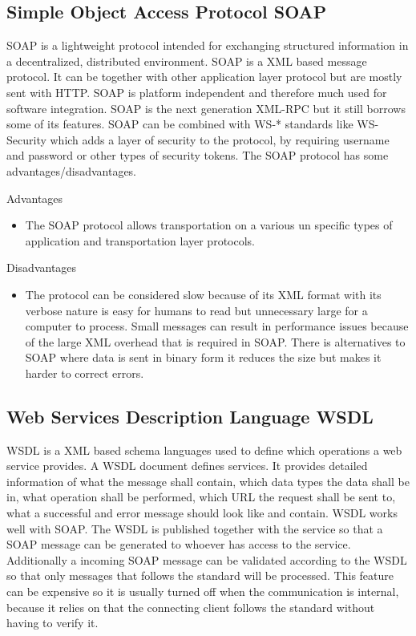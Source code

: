 \documentclass{llncs}
\begin{document}
\subsection{Simple Object Access Protocol SOAP}
SOAP is a lightweight protocol intended for exchanging structured information in a decentralized, distributed environment\cite{w3csoap}. SOAP is a XML based message protocol. It can be together with other application layer protocol but are mostly sent with HTTP. SOAP is platform independent and therefore much used for software  integration. SOAP is the next generation XML-RPC but it still borrows some of its features. SOAP can be combined with WS-* standards like WS-Security which adds a layer of security to the protocol, by requiring username and password or other types of security tokens. The SOAP protocol has some advantages/disadvantages.

Advantages
\begin{itemize}
\item The SOAP protocol allows transportation on a various un specific types of application and transportation layer protocols.
\end{itemize}
Disadvantages
\begin{itemize}
\item The protocol can be considered slow because of its XML format with its verbose nature is easy for humans to read but unnecessary large for a computer to process. Small messages can result in performance issues because of the large XML overhead that is required in SOAP. There is alternatives to SOAP where data is sent in binary form it reduces the size but makes it harder to correct errors.
\end{itemize}


\subsection{Web Services Description Language WSDL}
WSDL is a XML based schema languages used to define which operations a web service provides. A WSDL document defines services\cite{w3cwsdl}. It provides detailed information of what the message shall contain, which data types the data shall be in, what operation shall be performed, which URL the request shall be sent to, what a successful and error message should look like and contain. WSDL works well with SOAP. The WSDL is published together with the service so that a SOAP message can be generated to whoever has access to the service. Additionally a incoming SOAP message can be validated according to the WSDL so that only messages that follows the standard will be processed. This feature can be expensive so it is usually turned off when the communication is internal, because it relies on that the connecting client follows the standard without having to verify it.
\end{document}
